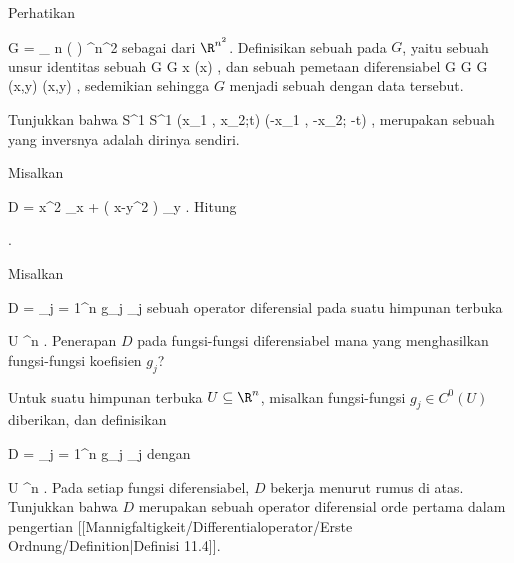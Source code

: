 {}
{

Perhatikan

\mavergleichskette
{\vergleichskette
{G
}
{ = }{ _{  n   } \! \left(  \R  \right)
}
{ \subseteq }{ \R^{n^2}
}
{    }{
}
{   }{
}
}
{}{}{}
sebagai
dari $\R^{n^2}$. Definisikan sebuah  {} pada $G$, yaitu sebuah unsur identitas
 sebuah
\maabbeledisp {\alpha} { G } { G
} { x } { \alpha (x)
} {,}
dan sebuah pemetaan diferensiabel
\maabbeledisp {\varphi} {G \times G} {G
} {(x,y)} { \varphi(x,y)
} {,}
sedemikian sehingga $G$ menjadi sebuah
dengan data tersebut.

}
{} {}

{}
{

Tunjukkan bahwa
\maabbeledisp {\varphi} {S^1 \times \R } { S^1 \times \R
} {(x_1 , x_2;t)} {(-x_1 , -x_2; -t)
} {,}
merupakan sebuah
 yang inversnya adalah dirinya sendiri.

}
{} {}

{}
{

Misalkan

\mavergleichskette
{\vergleichskette
{ D
}
{ = }{ x^2 \partial_x +  \left(  x-y^2  \right) \partial_y
}
{  }{
}
{    }{
}
{   }{
}
}
{}{}{.}
Hitung

 { . }

}
{} {}

{}
{

Misalkan

\mavergleichskette
{\vergleichskette
{ D
}
{ = }{ \sum_{j = 1}^n g_j \partial_j
}
{  }{
}
{    }{
}
{   }{
}
}
{}{}{}
sebuah operator diferensial pada suatu himpunan terbuka

\mavergleichskette
{\vergleichskette
{ U
}
{ \subseteq }{ \R^n
}
{  }{
}
{    }{
}
{   }{
}
}
{}{}{.}
Penerapan $D$ pada fungsi-fungsi diferensiabel mana yang menghasilkan fungsi-fungsi koefisien $g_j$?

}
{} {}

{}
{

Untuk suatu himpunan terbuka $U\subseteq\R^n$, misalkan fungsi-fungsi $g_j\in C^0(U)$ diberikan, dan definisikan

\mavergleichskette
{\vergleichskette
{ D
}
{ = }{ \sum_{j = 1}^n g_j \partial_j
}
{  }{
}
{    }{
}
{   }{
}
}
{}{}{}
dengan

\mavergleichskette
{\vergleichskette
{ U
}
{ \subseteq }{ \R^n
}
{  }{
}
{    }{
}
{   }{
}
}
{}{}{.}
Pada setiap fungsi diferensiabel, $D$ bekerja menurut rumus di atas. Tunjukkan bahwa $D$ merupakan sebuah operator diferensial orde pertama dalam pengertian
[[Mannigfaltigkeit/Differentialoperator/Erste Ordnung/Definition|Definisi 11.4]].

}
{} {}

